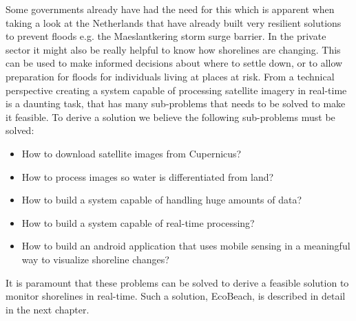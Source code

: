 Some governments already have had the need for this which is apparent when taking a look at the Netherlands that have already built very resilient solutions to prevent floods e.g. the Maeslantkering storm surge barrier.   \medbreak 
\noindent
In the private sector it might also be really helpful to know how shorelines are changing. This can be used to make informed decisions about where to settle down, or to allow preparation for floods for individuals living at places at risk.  \medbreak 
\noindent
From a technical perspective creating a system capable of processing satellite imagery in real-time is a daunting task, that has many sub-problems that needs to be solved to make it feasible.
To derive a solution we believe the following sub-problems must be solved:

\begin{itemize}
    \item How to download satellite images from Cupernicus?
    \item How to process images so water is differentiated from land?
    \item How to build a system capable of handling huge amounts of data? 
    \item How to build a system capable of real-time processing?
    \item How to build an android application that uses mobile sensing in a meaningful way to visualize shoreline changes?
\end{itemize}
\noindent
It is paramount that these problems can be solved to derive a feasible solution to monitor shorelines in real-time. Such a solution, EcoBeach, is described in detail in the next chapter.
